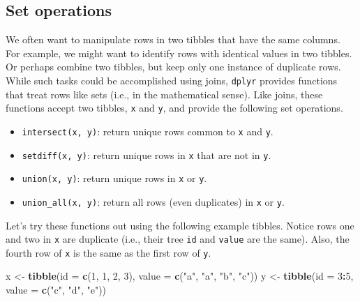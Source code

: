 \documentclass[
  11pt,
]{krantz}
\newenvironment{Shaded}{\begin{snugshade}}{\end{snugshade}}
\newcommand{\DataTypeTok}[1]{\textcolor[rgb]{0.13,0.29,0.53}{#1}}
\newcommand{\DecValTok}[1]{\textcolor[rgb]{0.00,0.00,0.81}{#1}}
\newcommand{\KeywordTok}[1]{\textcolor[rgb]{0.13,0.29,0.53}{\textbf{#1}}}
\newcommand{\NormalTok}[1]{#1}
\newcommand{\OperatorTok}[1]{\textcolor[rgb]{0.81,0.36,0.00}{\textbf{#1}}}
\newcommand{\StringTok}[1]{\textcolor[rgb]{0.31,0.60,0.02}{#1}}
\providecommand{\tightlist}{%
  \setlength{\itemsep}{0pt}\setlength{\parskip}{0pt}}
\theoremstyle{definition}
\theoremstyle{definition}
\theoremstyle{definition}
\theoremstyle{definition}
\theoremstyle{remark}
\begin{document}
\hypertarget{setOperations}{%
\subsection{Set operations}\label{setOperations}}

We often want to manipulate rows in two tibbles that have the same columns. For example, we might want to identify rows with identical values in two tibbles. Or perhaps combine two tibbles, but keep only one instance of duplicate rows. While such tasks could be accomplished using joins, \texttt{dplyr} provides functions that treat rows like sets (i.e., in the mathematical sense). Like joins, these functions accept two tibbles, \texttt{x} and \texttt{y}, and provide the following set operations.

\begin{itemize}
\tightlist
\item
  \texttt{intersect(x,\ y)}: return unique rows common to \texttt{x} and \texttt{y}.
\item
  \texttt{setdiff(x,\ y)}: return unique rows in \texttt{x} that are not in \texttt{y}.
\item
  \texttt{union(x,\ y)}: return unique rows in \texttt{x} or \texttt{y}.
\item
  \texttt{union\_all(x,\ y)}: return all rows (even duplicates) in \texttt{x} or \texttt{y}.
\end{itemize}

Let's try these functions out using the following example tibbles. Notice rows one and two in \texttt{x} are duplicate (i.e., their tree \texttt{id} and \texttt{value} are the same). Also, the fourth row of \texttt{x} is the same as the first row of \texttt{y}.

\begin{Shaded}
\begin{Highlighting}[]
\NormalTok{x \textless{}{-}}\StringTok{ }\KeywordTok{tibble}\NormalTok{(}\DataTypeTok{id =} \KeywordTok{c}\NormalTok{(}\DecValTok{1}\NormalTok{, }\DecValTok{1}\NormalTok{, }\DecValTok{2}\NormalTok{, }\DecValTok{3}\NormalTok{), }\DataTypeTok{value =} \KeywordTok{c}\NormalTok{(}\StringTok{"a"}\NormalTok{, }\StringTok{"a"}\NormalTok{, }\StringTok{"b"}\NormalTok{, }\StringTok{"c"}\NormalTok{))}
\NormalTok{y \textless{}{-}}\StringTok{ }\KeywordTok{tibble}\NormalTok{(}\DataTypeTok{id =} \DecValTok{3}\OperatorTok{:}\DecValTok{5}\NormalTok{, }\DataTypeTok{value =} \KeywordTok{c}\NormalTok{(}\StringTok{"c"}\NormalTok{, }\StringTok{"d"}\NormalTok{, }\StringTok{"e"}\NormalTok{))}
\end{Highlighting}
\end{Shaded}
\end{document}
